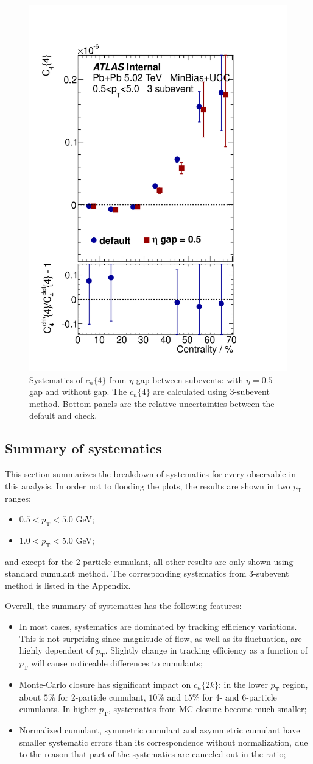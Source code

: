 \begin{figure}[H]
\includegraphics[width=.245\linewidth]{figs/sec_appendix/sys_PbPb502/PbPb502_sys7_3sub_Har4_Pt0.pdf}
\caption{Systematics of $c_n\{4\}$ from $\eta$ gap between subevents: with $\eta=0.5$ gap and without gap. The $c_n\{4\}$ are calculated using 3-subevent method. Bottom panels are the relative uncertainties between the default and check.}
\label{fig:sys_etaGap}
\end{figure}



\subsection{Summary of systematics}
This section summarizes the breakdown of systematics for every observable in this analysis. In order not to flooding the plots, the results are shown in two $p_\text{T}$ ranges:
\begin{itemize}
\item $0.5<p_\text{T}<5.0$ GeV;
\item $1.0<p_\text{T}<5.0$ GeV;
\end{itemize}
and except for the 2-particle cumulant, all other results are only shown using standard cumulant method. The corresponding systematics from 3-subevent method is listed in the Appendix.

Overall, the summary of systematics has the following features:
\begin{itemize}
\item In most cases, systematics are dominated by tracking efficiency variations. This is not surprising since magnitude of flow, as well as its fluctuation, are highly dependent of $p_\text{T}$. Slightly change in tracking efficiency as a function of $p_\text{T}$ will cause noticeable differences to cumulants;
\item Monte-Carlo closure has significant impact on $c_n\{2k\}$: in the lower $p_\text{T}$ region, about $5\%$ for 2-particle cumulant, $10\%$ and $15\%$ for 4- and 6-particle cumulants. In higher $p_\text{T}$, systematics from MC closure become much smaller;
\item Normalized cumulant, symmetric cumulant and asymmetric cumulant have smaller systematic errors than its correspondence without normalization, due to the reason that part of the systematics are canceled out in the ratio;
\end{itemize}

